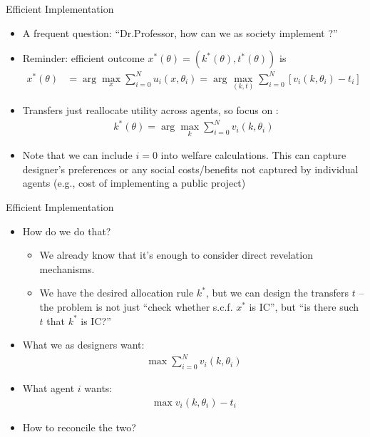 \documentclass[english,10pt
,aspectratio=169
]{beamer}
\begin{document}
\begin{frame}{Efficient Implementation}
\begin{itemize}
	\item A frequent question: ``Dr.Professor, how can we as society implement ?''
	\item Reminder: efficient outcome $x^*(\theta) = (k^*(\theta),t^*(\theta))$ is 
	\vspace{-0.5em}\begin{align*}
	x^*(\theta) &= \arg \max_x \sum_{i=0}^N u_i(x,\theta_i) 
	= \arg \max_{(k,t)} \sum_{i=0}^N \left[v_i(k,\theta_i) - t_i\right]
	\end{align*}
	\item Transfers just reallocate utility across agents, so focus on :
	\vspace{-1em}\begin{align*}
	k^*(\theta) = \arg \max_k \sum_{i=0}^N v_i(k,\theta_i)
	\end{align*}
	\item Note that we can include $i=0$ into welfare calculations. This can capture designer's preferences or any social costs/benefits not captured by individual agents (e.g., cost of implementing a public project)
\end{itemize}
\end{frame}


\begin{frame}{Efficient Implementation}
\begin{itemize}
	\item How do we do that?
	\begin{itemize}
		\item We already know that it's enough to consider direct revelation mechanisms.
		\item We have the desired allocation rule $k^*$, but we can design the transfers $t$ -- the problem is not just ``check whether s.c.f. $x^*$ is IC'', but ``is there such $t$ that $k^*$ is IC?''
	\end{itemize}
	\item What we as designers want:
	\vspace{-1em}\begin{align*}
	\max \sum_{i=0}^N v_i(k,\theta_i)
	\end{align*}
	\item What agent $i$ wants:
	\vspace{-1em}\begin{align*}
	\max v_i(k,\theta_i) - t_i
	\end{align*}
	\item How to reconcile the two?
\end{itemize}
\end{frame}
\end{document}
